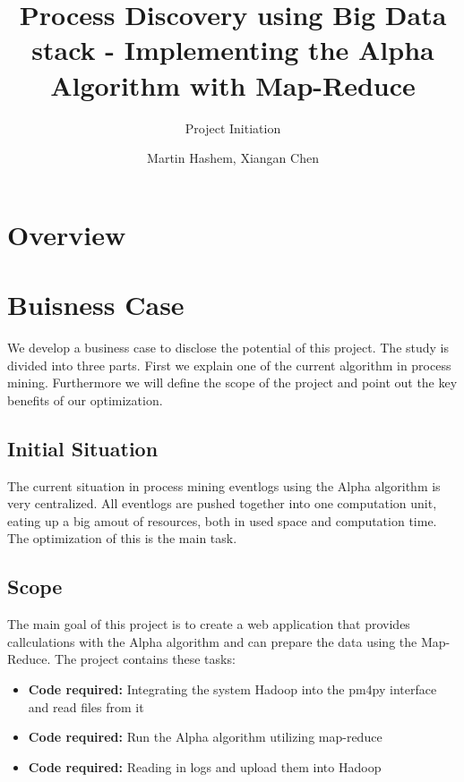 \documentclass[runningheads]{llncs}
\begin{document}
%
\title{Process Discovery using Big Data stack - Implementing the Alpha Algorithm with Map-Reduce}
\subtitle{Project Initiation}
%
%

\author{{\large Martin Hashem, Xiangan Chen}}

%
\maketitle              %
%
%
%
%
\section{Overview}
\section{Buisness Case}
We develop a business case to disclose the potential of this project. The study is divided into three parts. First we explain one of the current algorithm in process mining. Furthermore we will define the scope of the project and point out the key benefits of our optimization.
\subsection{Initial Situation}
The current situation in process mining eventlogs using the Alpha algorithm is very centralized. All eventlogs are pushed together into one computation unit, eating up a big amout of resources, both in used space and computation time. The optimization of this is the main task.
\subsection{Scope}
The main goal of this project is to create a web application that provides callculations with the Alpha algorithm and can prepare the data using the Map-Reduce. The project contains these tasks:\\
\begin{itemize}
	\item[\cdot] \textbf{Code required:} Integrating the system Hadoop into the pm4py interface and read files from it
	\item[\cdot] \textbf{Code required:} Run the Alpha algorithm utilizing map-reduce
	\item[\cdot] \textbf{Code required:} Reading in logs and upload them into Hadoop
\end{itemize}
\end{document}
